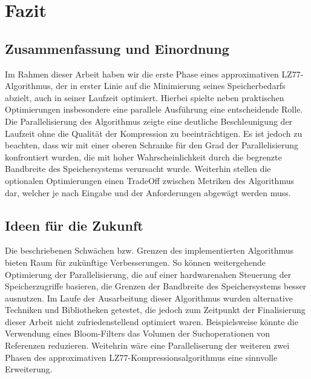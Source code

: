 \chapter{Fazit}
\section{Zusammenfassung und Einordnung}
Im Rahmen dieser Arbeit haben wir die erste Phase eines approximativen LZ77- Algorithmus, der in erster Linie auf die Minimierung
seines Speicherbedarfs abzielt, auch in seiner Laufzeit optimiert. Hierbei spielte neben praktischen Optimierungen insbesondere eine 
parallele Ausführung eine entscheidende Rolle. Die Parallelisierung des Algorithmus zeigte eine deutliche Beschleunigung der Laufzeit ohne
die Qualität der Kompression zu beeinträchtigen. Es ist jedoch zu beachten, dass wir mit einer oberen Schranke für den Grad der Parallelisierung
konfrontiert wurden, die mit hoher Wahrscheinlichkeit durch die begrenzte Bandbreite des Speichersystems verursacht wurde. Weiterhin
stellen die optionalen Optimierungen einen TradeOff zwischen Metriken des Algorithmus dar, welcher je nach Eingabe und der Anforderungen
abgewägt werden muss.

\section{Ideen für die Zukunft}
Die beschriebenen Schwächen bzw. Grenzen des implementierten Algorithmus bieten Raum für zukünftige Verbesserungen. So können weitergehende
Optimierung der Parallelisierung, die auf einer hardwarenahen Steuerung der Speicherzugriffe basieren, die Grenzen der Bandbreite des Speichersystems
besser ausnutzen. Im Laufe der Ausarbeitung dieser Algorithmus wurden alternative Techniken und Bibliotheken getestet, die jedoch zum Zeitpunkt
der Finalisierung dieser Arbeit nicht zufriedenstellend optimiert waren. Beispielsweise könnte die Verwendung eines Bloom-Filters \cite{bloom} das Volumen
der Suchoperationen von Referenzen reduzieren. Weitehrin wäre eine Paralleliserung der weiteren zwei Phasen des approximativen LZ77-Kompressionsalgorithmus
eine sinnvolle Erweiterung.